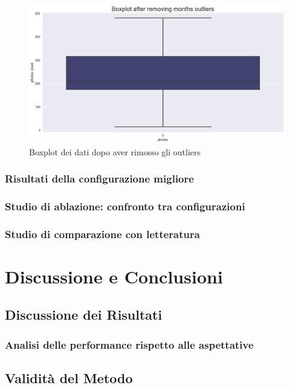 \documentclass[12pt,a4paper,twoside]{article}
\begin{document}
\begin{figure}[h!]
    \centering
    \includegraphics[width=\textwidth ,height=\textheight, keepaspectratio]{assets/boxplot-wout-outliers.png}
    \caption{Boxplot dei dati dopo aver rimosso gli outliers}
    \label{fig:boxplot-outliers}
\end{figure}


\subsubsection{Risultati della configurazione migliore}
\subsubsection{Studio di ablazione: confronto tra configurazioni}
\subsubsection{Studio di comparazione con letteratura}


\newpage
\section{Discussione e Conclusioni}

\subsection{Discussione dei Risultati}
\subsubsection{Analisi delle performance rispetto alle aspettative}

\subsection{Validità del Metodo}
\end{document}
